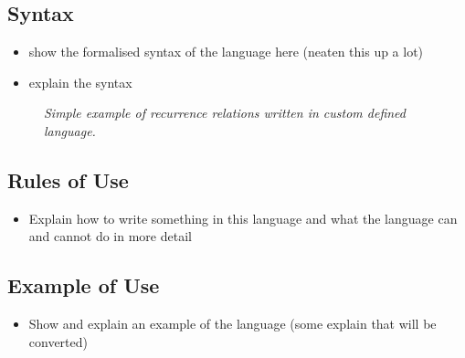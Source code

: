 \documentclass{article}
\begin{document}
\subsection{Syntax}

\begin{itemize}
  \item show the formalised syntax of the language here   (neaten this up a lot)
  \item explain the syntax  
\end{itemize}


\begin{figure}[H]
	\centering
	
	\caption{\it Simple example of recurrence relations written in custom defined language.}
	\label{fig:parsetreecode}
\end{figure} 


\subsection{Rules of Use}

\begin{itemize}
  \item Explain how to write something in this language and what the language can and cannot do in more detail 
\end{itemize}




\subsection{Example of Use}


\begin{itemize}
  \item Show and explain an example of the language (some explain that will be converted) 
\end{itemize}
\end{document}
